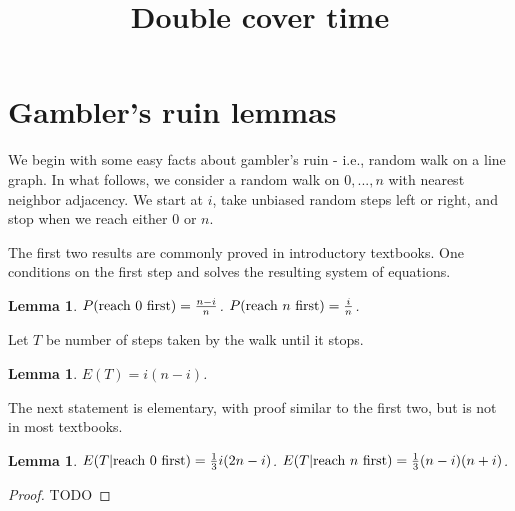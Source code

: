 \documentclass[12pt]{amsart}
\title{Double cover time}
\theoremstyle{plain}
\newtheorem{lemma}[theorem]{Lemma}
\theoremstyle{definition}
\theoremstyle{remark}
\begin{document}
\maketitle
\section{Gambler's ruin lemmas}
We begin with some easy facts about gambler's ruin - i.e., random walk on a line
graph.
In what follows, we consider a random walk on ${0, ..., n}$ with nearest neighbor
adjacency.
We start at $i$, take unbiased random steps left or right, and stop when we
reach either $0$ or $n$.

The first two results are commonly proved in introductory textbooks.
One conditions on the first step and solves the resulting system of equations.

\begin{lemma}
$P(\textup{reach 0 first}) = \frac{n-i}{n}$.
$P(\textup{reach $n$ first}) = \frac{i}{n}$.
\end{lemma}

Let $T$ be number of steps taken by the walk until it stops.

\begin{lemma}
$E(T) = i(n-i)$.
\end{lemma}

The next statement is elementary, with proof similar to the first two, but is
not in most textbooks. 

\begin{lemma}
$E(T|\textup{reach 0 first}) = \frac{1}{3}i(2n-i)$.
$E(T|\textup{reach $n$ first}) = \frac{1}{3}(n-i)(n+i)$.
\end{lemma}
\begin{proof}
TODO
\end{proof}
\end{document}
